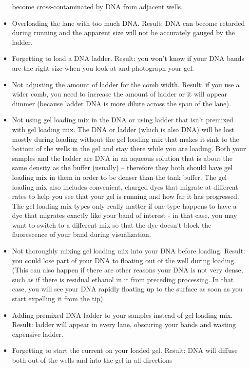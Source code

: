 \documentclass[
  letterpaper,
  DIV=11,
  numbers=noendperiod]{scrreprt}
\begin{document}
\begin{itemize}
  become cross-contaminated by DNA from adjacent wells.
\item
  Overloading the lane with too much DNA. Result: DNA can become
  retarded during running and the apparent size will not be accurately
  gauged by the ladder.
\item
  Forgetting to load a DNA ladder. Result: you won't know if your DNA
  bands are the right size when you look at and photograph your gel.
\item
  Not adjusting the amount of ladder for the comb width. Result: if you
  use a wider comb, you need to increase the amount of ladder or it will
  appear dimmer (because ladder DNA is more dilute across the span of
  the lane).
\item
  Not using gel loading mix in the DNA or using ladder that isn't
  premixed with gel loading mix. The DNA or ladder (which is also DNA)
  will be lost mostly during loading without the gel loading mix that
  makes it sink to the bottom of the wells in the gel and stay there
  while you are loading. Both your samples and the ladder are DNA in an
  aqueous solution that is about the same density as the buffer
  (usually) -- therefore they both should have gel loading mix in them
  in order to be denser than the tank buffer. The gel loading mix also
  includes convenient, charged dyes that migrate at different rates to
  help you see that your gel is running and how far it has progressed.
  The gel loading mix types only really matter if one type happens to
  have a dye that migrates exactly like your band of interest - in that
  case, you may want to switch to a different mix so that the dye
  doesn't block the fluorescence of your band during visualization.
\item
  Not thoroughly mixing gel loading mix into your DNA before loading.
  Result: you could lose part of your DNA to floating out of the well
  during loading. (This can also happen if there are other reasons your
  DNA is not very dense, such as if there is residual ethanol in it from
  preceding processing. In that case, you will see your DNA rapidly
  floating up to the surface as soon as you start expelling it from the
  tip).
\item
  Adding premixed DNA ladder to your samples instead of gel loading mix.
  Result: ladder will appear in every lane, obscuring your bands and
  wasting expensive ladder.
\item
  Forgetting to start the current on your loaded gel. Result: DNA will
  diffuse both out of the wells and into the gel in all directions

\end{itemize}
\end{document}
